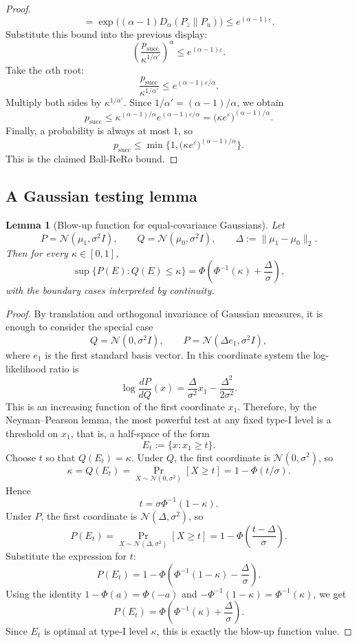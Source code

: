 \documentclass[11pt,a4paper]{report}
\theoremstyle{plain}
\newtheorem{lemma}[theorem]{Lemma}
\theoremstyle{definition}
\theoremstyle{remark}
\begin{document}
\begin{proof}
\[=
\exp\big((\alpha-1)D_\alpha(P_z\|P_u)\big)
\le
 e^{(\alpha-1)\varepsilon}.
\]
Substitute this bound into the previous display:
\[
\left(\frac{p_{\mathrm{succ}}}{\kappa^{1/\alpha'}}\right)^\alpha
\le
 e^{(\alpha-1)\varepsilon}.
\]
Take the $\alpha$th root:
\[
\frac{p_{\mathrm{succ}}}{\kappa^{1/\alpha'}}
\le
 e^{(\alpha-1)\varepsilon/\alpha}.
\]
Multiply both sides by $\kappa^{1/\alpha'}$. Since $1/\alpha'=(\alpha-1)/\alpha$, we obtain
\[
p_{\mathrm{succ}}
\le
\kappa^{(\alpha-1)/\alpha}e^{(\alpha-1)\varepsilon/\alpha}
=
\big(\kappa e^{\varepsilon}\big)^{(\alpha-1)/\alpha}.
\]
Finally, a probability is always at most $1$, so
\[
p_{\mathrm{succ}}
\le
\min\Big\{1,\big(\kappa e^{\varepsilon}\big)^{(\alpha-1)/\alpha}\Big\}.
\]
This is the claimed Ball-ReRo bound.
\end{proof}

\subsection{A Gaussian testing lemma}

\begin{lemma}[Blow-up function for equal-covariance Gaussians]
\label{lem:gaussian-blowup}
Let
\[
P=\mathcal{N}(\mu_1,\sigma^2 I),
\qquad
Q=\mathcal{N}(\mu_0,\sigma^2 I),
\qquad
\Delta:=\|\mu_1-\mu_0\|_2.
\]
Then for every $\kappa\in[0,1]$,
\[
\sup\{P(E): Q(E)\le \kappa\}
=
\Phi\!\left(\Phi^{-1}(\kappa)+\frac{\Delta}{\sigma}\right),
\]
with the boundary cases interpreted by continuity.
\end{lemma}

\begin{proof}
By translation and orthogonal invariance of Gaussian measures, it is enough to consider the special case
\[
Q=\mathcal{N}(0,\sigma^2 I),
\qquad
P=\mathcal{N}(\Delta e_1,\sigma^2 I),
\]
where $e_1$ is the first standard basis vector. In this coordinate system the log-likelihood ratio is
\[
\log\frac{dP}{dQ}(x)
=
\frac{\Delta}{\sigma^2}x_1-\frac{\Delta^2}{2\sigma^2}.
\]
This is an increasing function of the first coordinate $x_1$. Therefore, by the Neyman--Pearson lemma, the most powerful test at any fixed type-I level is a threshold on $x_1$, that is, a half-space of the form
\[
E_t:=\{x: x_1\ge t\}.
\]
Choose $t$ so that $Q(E_t)=\kappa$. Under $Q$, the first coordinate is $\mathcal{N}(0,\sigma^2)$, so
\[
\kappa=Q(E_t)=\Pr_{X\sim\mathcal{N}(0,\sigma^2)}[X\ge t]
=1-\Phi(t/\sigma).
\]
Hence
\[
t=\sigma\Phi^{-1}(1-\kappa).
\]
Under $P$, the first coordinate is $\mathcal{N}(\Delta,\sigma^2)$, so
\[
P(E_t)
=
\Pr_{X\sim\mathcal{N}(\Delta,\sigma^2)}[X\ge t]
=
1-\Phi\!\left(\frac{t-\Delta}{\sigma}\right).
\]
Substitute the expression for $t$:
\[
P(E_t)
=
1-\Phi\!\left(\Phi^{-1}(1-\kappa)-\frac{\Delta}{\sigma}\right).
\]
Using the identity $1-\Phi(a)=\Phi(-a)$ and $-\Phi^{-1}(1-\kappa)=\Phi^{-1}(\kappa)$, we get
\[
P(E_t)
=
\Phi\!\left(\Phi^{-1}(\kappa)+\frac{\Delta}{\sigma}\right).
\]
Since $E_t$ is optimal at type-I level $\kappa$, this is exactly the blow-up function value.
\end{proof}
\end{document}
